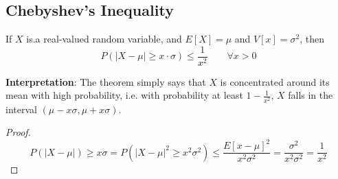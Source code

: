 \subsection{Chebyshev's Inequality}
\begin{theorem}
If $X$ is.a real-valued random variable, and $E[X] = \mu$ and $V[x] =
\sigma^2$, then
\[
	P(\vert X - \mu \vert \geq x \cdot \sigma) \leq \frac{1}{x^2} 
	\qquad \forall x > 0
\]
\end{theorem}
\noindent \textbf{Interpretation}: The theorem simply says that $X$ is
concentrated around its mean with high probability, i.e. with probability at
least $1 - \frac{1}{x^2}$, $X$ falls in the interval $(\mu - x \sigma,
\mu + x \sigma)$.
\begin{proof}
\[
	  P(\vert X - \mu \vert) \geq x \sigma
	= P(\vert X - \mu \vert^2 \geq x^2 \sigma^2)
	\leq \frac{E[x - \mu]^2}{x^2 \sigma^2}
	= \frac{\sigma^2}{x^2 \sigma^2}
	= \frac{1}{x^2}
\]
\end{proof}
